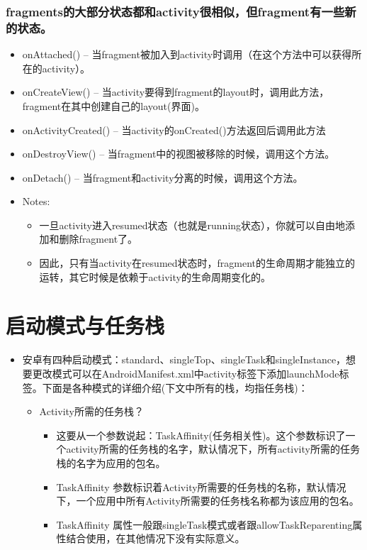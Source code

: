 \documentclass[9pt, b5paaper]{book}
\begin{document}
\subsection{fragments的大部分状态都和activity很相似，但fragment有一些新的状态。}
\label{sec-3-1-6}
\begin{itemize}
\item onAttached() -- 当fragment被加入到activity时调用（在这个方法中可以获得所在的activity）。
\item onCreateView() -- 当activity要得到fragment的layout时，调用此方法，fragment在其中创建自己的layout(界面)。
\item onActivityCreated() -- 当activity的onCreated()方法返回后调用此方法
\item onDestroyView() -- 当fragment中的视图被移除的时候，调用这个方法。
\item onDetach() -- 当fragment和activity分离的时候，调用这个方法。
\item Notes:
\begin{itemize}
\item 一旦activity进入resumed状态（也就是running状态），你就可以自由地添加和删除fragment了。
\item 因此，只有当activity在resumed状态时，fragment的生命周期才能独立的运转，其它时候是依赖于activity的生命周期变化的。
\end{itemize}
\end{itemize}


\chapter{启动模式与任务栈}
\label{sec-4}
\begin{itemize}
\item 安卓有四种启动模式：standard、singleTop、singleTask和singleInstance，想要更改模式可以在AndroidManifest.xml中activity标签下添加launchMode标签。下面是各种模式的详细介绍(下文中所有的栈，均指任务栈)：
\begin{itemize}
\item Activity所需的任务栈？
\begin{itemize}
\item 这要从一个参数说起：TaskAffinity(任务相关性)。这个参数标识了一个activity所需的任务栈的名字，默认情况下，所有activity所需的任务栈的名字为应用的包名。
\item TaskAffinity 参数标识着Activity所需要的任务栈的名称，默认情况下，一个应用中所有Activity所需要的任务栈名称都为该应用的包名。
\item TaskAffinity 属性一般跟singleTask模式或者跟allowTaskReparenting属性结合使用，在其他情况下没有实际意义。
\end{itemize}
\end{itemize}
\end{itemize}
\end{document}
